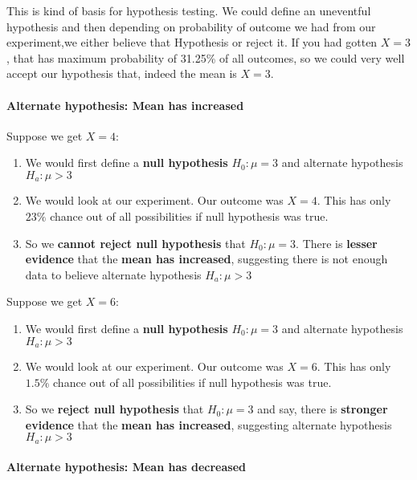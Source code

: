 \documentclass[float=false,crop=false]{standalone}
\begin{document}
This is kind of basis for hypothesis testing. We could define an
uneventful hypothesis and then depending on probability of outcome we
had from our experiment,we either believe that Hypothesis or reject it.
If you had gotten \(X=3\), that has maximum probability of 31.25\% of
all outcomes, so we could very well accept our hypothesis that, indeed
the mean is \(X=3\).

    \paragraph{Alternate hypothesis: Mean has
increased}\label{alternate-hypothesis-mean-has-increased}

Suppose we get \textbf{\(X=4\)}:

\begin{enumerate}
\def\labelenumi{\arabic{enumi}.}
\tightlist
\item
  We would first define a \textbf{null hypothesis} \(H_0: \mu = 3\) and
  alternate hypothesis \(H_a: \mu > 3\)
\item
  We would look at our experiment. Our outcome was \(X = 4\). This has
  only \(23\%\) chance out of all possibilities if null hypothesis was
  true.
\item
  So we \textbf{cannot reject null hypothesis} that \(H_0: \mu = 3\).
  There is \textbf{lesser evidence} that the \textbf{mean has
  increased}, suggesting there is not enough data to believe alternate
  hypothesis \(H_a: \mu > 3\)
\end{enumerate}

Suppose we get \textbf{\(X=6\)}:

\begin{enumerate}
\def\labelenumi{\arabic{enumi}.}
\tightlist
\item
  We would first define a \textbf{null hypothesis} \(H_0: \mu = 3\) and
  alternate hypothesis \(H_a: \mu > 3\)
\item
  We would look at our experiment. Our outcome was \(X = 6\). This has
  only \(1.5\%\) chance out of all possibilities if null hypothesis was
  true.
\item
  So we \textbf{reject null hypothesis} that \(H_0: \mu = 3\) and say,
  there is \textbf{stronger evidence} that the \textbf{mean has
  increased}, suggesting alternate hypothesis \(H_a: \mu > 3\)
\end{enumerate}

    \paragraph{Alternate hypothesis: Mean has
decreased}\label{alternate-hypothesis-mean-has-decreased}
\end{document}
